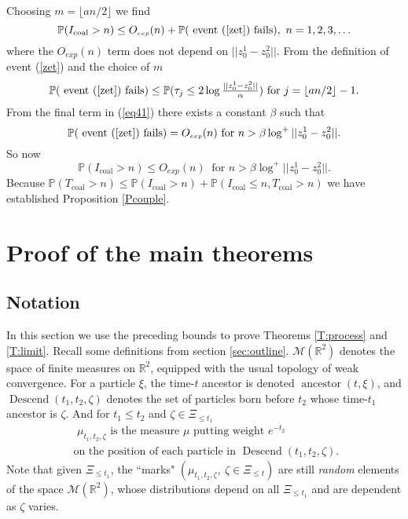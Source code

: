 \documentclass[12pt]{article}
\newcommand{\MM}{\mbox{${\mathcal M}$}}
\newcommand{\sfrac}[2]{{\textstyle\frac{#1}{#2}}}
\newcommand{\Reals}{{\mathbb{R}}}
\renewcommand{\Pr}{{\mathbb P}}
\newcommand{\Tcouple}{T_{\mathrm{coal}}}
\newcommand{\Icouple}{I_{\mathrm{coal}}}
\DeclareMathOperator{\ancestor}{ancestor}
\DeclareMathOperator{\descend}{Descend}
\newcommand{\Oexp}{O_{\scriptscriptstyle exp}}
\begin{document}
Choosing $m = \lfloor an/2 \rfloor$  we find
\[  \Pr(\Icouple > n) \le 
\Oexp(n) +
 \Pr( \mbox{ event (\ref{zet}) fails}) , \  n  = 1,2, 3, \ldots
 \]
where the $\Oexp(n)$ term does not depend on 
 $|| z^1_0 - z^2_0 ||$.
From the definition of event (\ref{zet}) and the choice of $m$
\begin{equation}
  \Pr( \mbox{ event (\ref{zet}) fails}) 
\le
\Pr( \tau_j \le 2 \log \sfrac{|| z^1_0 - z^2_0 ||} {\alpha} ) 
\mbox{ for } j = \lfloor an/2 \rfloor - 1 .
\label{tlog}
\end{equation}
From the final term in (\ref{eq41}) there exists a constant $\beta$ such that 
\[
  \Pr( \mbox{ event (\ref{zet}) fails}) = \Oexp(n) \mbox{ for } n > \beta  \log^+ || z^1_0 -  z^2_0 || .
  \] 
  So now 
  \[  \Pr(\Icouple > n) \le  \Oexp(n) \ \mbox{ for } n > \beta  \log^+ || z^1_0 -  z^2_0 || . \]
Because 
$\Pr( \Tcouple > n) \le  \Pr(\Icouple > n) + \Pr( \Icouple \le  n,   \Tcouple > n)$ 
we have established Proposition \ref{Pcouple}.





 \section{Proof of the main theorems}
 \subsection{Notation}
 \label{sec:Nota}
 In this section we use the preceding bounds to prove Theorems \ref{T:process} and \ref{T:limit}. 
 Recall some definitions from section \ref{sec:outline}.
 $\MM(\Reals^2)$ denotes the space of finite measures on $\Reals^2$, equipped with the usual topology of weak convergence. 
 For a particle $\xi$, the time-$t$ ancestor is denoted $\ancestor(t,\xi)$, and 
 $\descend(t_1,t_2,\zeta)$ denotes the set of particles born before $t_2$ whose time-$t_1$ ancestor is $\zeta$.
 And for $t_1  \le t_2$ and $\zeta \in \Xi_{\le t_1}$ 
\begin{eqnarray}
 \mbox{ $\mu_{t_1,t_2,\zeta}$ 
is the measure $\mu$ putting weight $e^{-t_2}$} \nonumber\\
\mbox{  on the position of each particle in $\descend(t_1,t_2,\zeta)$.} \label{def:mu3}
\end{eqnarray}
Note that given $\Xi_{\le t_1}$, the
``marks"  $(\mu_{t_1,t_2,\zeta}, \ \zeta \in \Xi_{\le t}) $ are still  {\em random} elements of the space  $\MM(\Reals^2)$, 
whose distributions depend on all $\Xi_{\le t_1}$ and are dependent as $\zeta$ varies.
\end{document}
